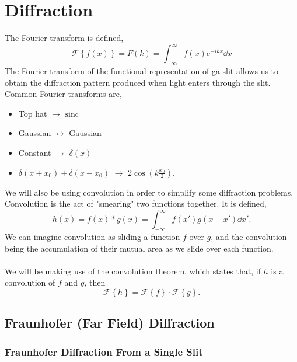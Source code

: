 \documentclass{book}
\begin{document}
{\chapter{Diffraction}
The Fourier transform is defined,
\begin{equation}
	\mathcal{F}\left\{f(x)\right\} = F(k) = \int_{-\infty}^{\infty}f(x)e^{-ikx}\dd{x}
\end{equation}
The Fourier transform of the functional representation of ga slit allows us to obtain the diffraction pattern produced when light enters through the slit. Common Fourier transforms are,
\begin{itemize}
	\item Top hat $\rightarrow$ $\text{sinc}$
	\item Gaussian $\leftrightarrow$ Gaussian
	\item Constant $\to$ $\delta(x)$
	\item $\delta(x + x_0) + \delta(x - x_0)$ $\to$ $2\cos(k\frac{x_0}{2})$.
\end{itemize} 
We will also be using convolution in order to simplify some diffraction problems. Convolution is the act of "smearing" two functions together. It is defined,
\begin{equation}
	h(x) = f(x) * g(x) = \int_{-\infty}^{\infty}f(x')g(x-x')\dd{x'}.
\end{equation}
We can imagine convolution as sliding a function $f$ over $g$, and the convolution being the accumulation of their mutual area as we slide over each function.
\\\\
We will be making use of the convolution theorem, which states that, if $h$ is a convolution of $f$ and $g$, then
\begin{equation}
	\mathcal{F}\left\{h\right\} = \mathcal{F}\left\{f\right\}\cdot\mathcal{F}\left\{g\right\}.
\end{equation}
\section{Fraunhofer (Far Field) Diffraction}
\subsection{Fraunhofer Diffraction From a Single Slit}
\begin{figure}[h]
	\centering
\end{figure}}
\end{document}
